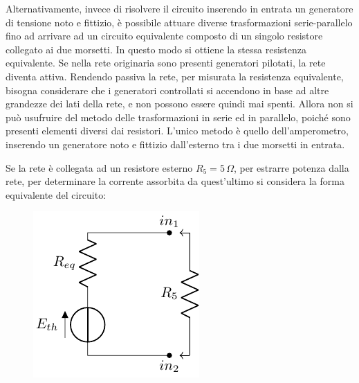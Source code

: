 \documentclass{article}
\numberwithin{equation}{subsection}
\begin{document}
Alternativamente, invece di risolvere il circuito inserendo in entrata un generatore di tensione noto e fittizio, è possibile attuare diverse trasformazioni serie-parallelo 
fino ad arrivare ad un circuito equivalente composto di un singolo resistore collegato ai due morsetti. In questo modo si ottiene la stessa resistenza equivalente.  
Se nella rete originaria sono presenti generatori pilotati, la rete diventa attiva. Rendendo passiva la rete, per misurata la resistenza equivalente, bisogna considerare 
che i generatori controllati si accendono in base ad altre grandezze dei lati della rete, e non possono essere quindi mai spenti. Allora non si può usufruire del metodo delle 
trasformazioni in serie ed in parallelo, poiché sono presenti elementi diversi dai resistori. L'unico metodo è quello dell'amperometro, inserendo un generatore noto e fittizio 
dall'esterno tra i due morsetti in entrata. 


Se la rete è collegata ad un resistore esterno $R_5=5\,\Omega$, per estrarre potenza dalla rete, per determinare la corrente assorbita da quest'ultimo si considera la forma equivalente 
del circuito:
\begin{figure}[H]%
    \centering
    \includegraphics{circuito-8-carico.pdf}
    \label{fig:circuito-8-carico}
\end{figure}
\end{document}
